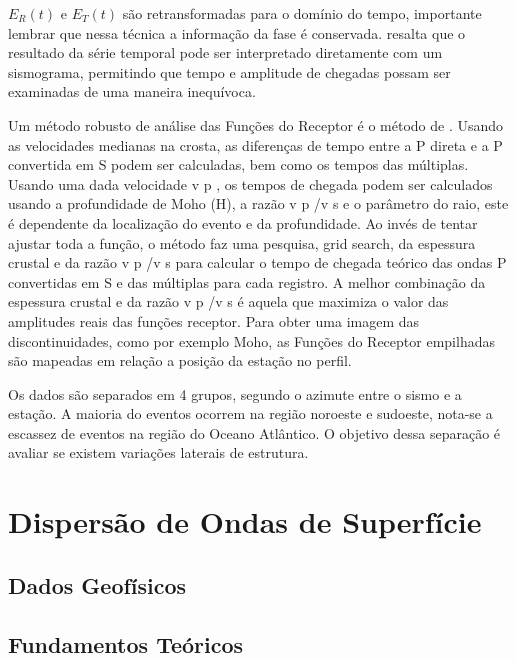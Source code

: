$E_{R}(t)$ e $E_{T}(t)$ são retransformadas para o domínio do tempo, importante lembrar que nessa técnica a informação da fase é conservada. \cite{langston_structure_1979} resalta que o resultado da série temporal pode ser interpretado diretamente com um sismograma, permitindo que tempo e amplitude de chegadas possam ser examinadas de uma maneira inequívoca.

Um método robusto de análise das Funções do Receptor é o método de \cite{Zhu_Kanamori_2000}. Usando as velocidades medianas na crosta, as diferenças de tempo entre a P direta e a P convertida em S podem ser calculadas, bem como os tempos das múltiplas. Usando uma dada velocidade v p , os tempos de chegada podem ser calculados usando a profundidade de Moho (H), a razão v p /v s e o parâmetro do raio, este é dependente da localização do evento e da profundidade. Ao invés de tentar ajustar toda a função, o método faz uma pesquisa, grid search, da espessura crustal e da razão v p /v s para calcular o tempo de chegada teórico das ondas P convertidas em S e das múltiplas para cada registro. A melhor combinação da espessura crustal e da razão v p /v s é aquela que maximiza o valor das amplitudes reais das funções receptor. Para obter uma imagem das discontinuidades, como por exemplo Moho, as Funções do Receptor empilhadas são mapeadas em relação a posição da estação no perfil. 

Os dados são separados em 4 grupos, segundo o azimute entre o sismo e a estação. A maioria do eventos ocorrem na região noroeste e sudoeste, nota-se a escassez de eventos na região do Oceano Atlântico. O objetivo dessa separação é avaliar se existem variações laterais de estrutura.


\section*{Dispersão de Ondas de Superfície}
\subsection*{Dados Geofísicos}
\subsection*{Fundamentos Teóricos}